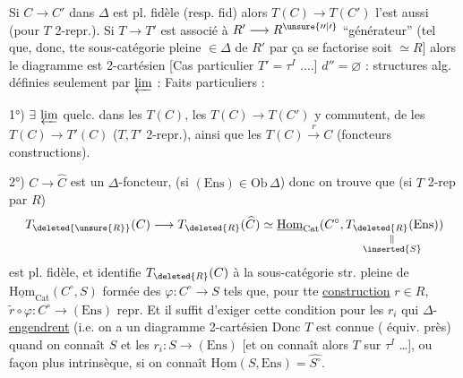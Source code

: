 Si $C\longrightarrow C'$ dans $\Delta$ est pl. fidèle (resp. fid) alors $T(C)\longrightarrow T(C')$ l'est aussi (pour $T$ 2-repr.).  Si $T\longrightarrow T'$ est associé à $R'\longrightarrow R^{\unsure{\prime\prime|\prime}}$ ``\inserted{$\Delta$-}générateur'' (tel que, donc, tte sous-catégorie pleine $\in\Delta$ de $R'$ par  ça se factorise soit  $\simeq R$] alors le diagramme
est 2-cartésien
[Cas particulier  $T'=\tau^{I}$ ....]
$d''=\varnothing$ : structures alg. définies seulement par $\varprojlim$ : Faits particuliers :

1°) $\exists$ $\varprojlim$ quelc. dans les $T(C)$, les $T(C)\longrightarrow T(C')$ y commutent, de  les $T(C)\longrightarrow T'(C)$ ($T,T'$ 2-repr.), ainsi que les $T(C)\xrightarrow{r}C$ (foncteurs constructions).

2°) $C\longrightarrow\widehat C$ est un $\Delta$-foncteur,  (si $(\mathrm{Ens})\in\mathrm{Ob}\,\Delta$) donc on trouve que (si $T$ 2-rep par $R$)
\[
T_{\deleted{\unsure{R}}}(C)\longrightarrow T_{\deleted{R}}(\widehat C)
\simeq\underline{\mathrm{Hom}}_{\mathrm{Cat}}(C^{\circ},\underset{\substack{\Vert\\\inserted{S}}}{T_{\deleted{R}}(\mathrm{Ens})})
\]
est pl. fidèle, et identifie $T_{\deleted{R}}(C)$ à la sous-catégorie str. pleine de $\underline{\mathrm{Hom}}_{\mathrm{Cat}}(C^{\circ},S)$ formée des $\varphi:C^{\circ}\longrightarrow S$ tels que, pour tte \uline{construction} $r\in R$,  $\widetilde r\circ\varphi:C^{\circ}\longrightarrow(\mathrm{Ens})$  repr. Et il suffit d'exiger cette condition pour les $r_i$ qui $\Delta$-\uline{engendrent} (i.e. on a un diagramme 2-cartésien
Donc $T$ est connue ( équiv. près) quand on connaît $S$ et les $r_i:S\longrightarrow(\mathrm{Ens})$ [et on connaît alors  $T$ sur $\tau^{I}$ \ldots], ou  façon plus intrinsèque, si on connaît   $\underline{\mathrm{Hom}}(S,\mathrm{Ens})=\widehat{S^\circ}$.

